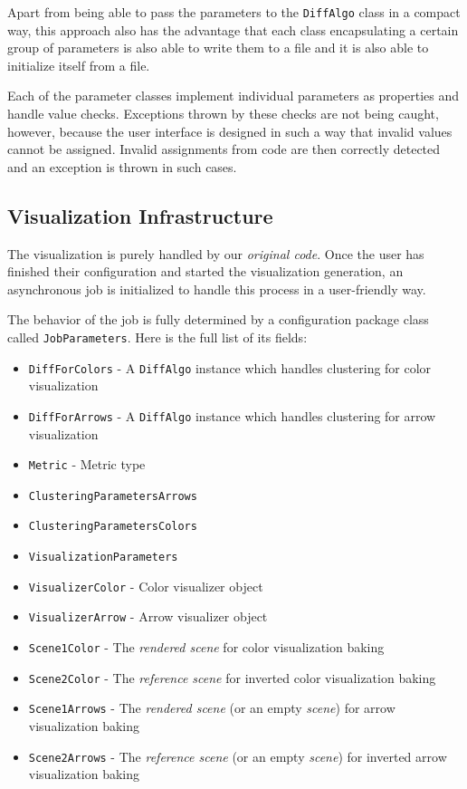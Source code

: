 Apart from being able to pass the parameters to the \verb+DiffAlgo+ class in a compact way, this approach also has the advantage that each class encapsulating a certain group of parameters is also able to write them to a file and it is also able to initialize itself from a file\footnotemark.


Each of the parameter classes implement individual parameters as properties and handle value checks. Exceptions thrown by these checks are not being caught, however, because the user interface is designed in such a way that invalid values cannot be assigned. Invalid assignments from code are then correctly detected and an exception is thrown in such cases.
\subsection{Visualization Infrastructure}
\label{subsec:implementation-architecture-infrastructure}

The visualization is purely handled by our {\it original code}. Once the user has finished their configuration and started the visualization generation, an asynchronous job is initialized to handle this process in a user-friendly way.

The behavior of the job is fully determined by a configuration package class called \verb+JobParameters+. Here is the full list of its fields:

\begin{itemize}
\item \verb+DiffForColors+ - A \verb+DiffAlgo+ instance which handles clustering for color visualization
\item \verb+DiffForArrows+ - A \verb+DiffAlgo+ instance which handles clustering for arrow visualization
\item \verb+Metric+ - Metric type
\item \verb+ClusteringParametersArrows+
\item \verb+ClusteringParametersColors+
\item \verb+VisualizationParameters+
\item \verb+VisualizerColor+ - Color visualizer object
\item \verb+VisualizerArrow+ - Arrow visualizer object
\item \verb+Scene1Color+ - The {\it rendered scene} for color visualization baking
\item \verb+Scene2Color+ - The {\it reference scene} for inverted color visualization baking
\item \verb+Scene1Arrows+ - The {\it rendered scene} (or an empty {\it scene}) for arrow visualization baking
\item \verb+Scene2Arrows+ - The {\it reference scene} (or an empty {\it scene}) for inverted arrow visualization baking
\end{itemize}

